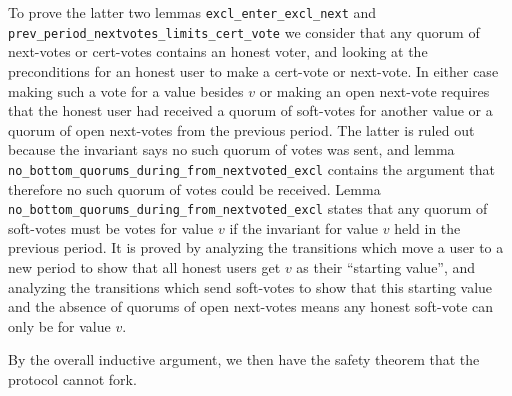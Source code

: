 To prove the latter two lemmas \lstinline{excl_enter_excl_next} and
\lstinline{prev_period_nextvotes_limits_cert_vote} we consider that any quorum
of next-votes or cert-votes contains an honest voter, and looking at the
preconditions for an honest user to make a cert-vote or next-vote.
In either case making such a vote for a value besides $v$ or making an open
next-vote requires that the honest user had received a quorum of
soft-votes for another value or a quorum of open next-votes from the
previous period.
The latter is ruled out because the invariant says no such quorum of votes
was sent, and lemma \lstinline{no_bottom_quorums_during_from_nextvoted_excl}
contains the argument that therefore no such quorum of votes could
be received.
Lemma \lstinline{no_bottom_quorums_during_from_nextvoted_excl}
states that any quorum of soft-votes must be votes for value $v$ if the
invariant for value $v$ held in the previous period.
It is proved by analyzing the transitions which move a user to a new period
to show that all honest users get $v$ as their ``starting value'',
and analyzing the transitions which send soft-votes to show that this
starting value and the absence of quorums of open next-votes means any honest
soft-vote can only be for value $v$.

By the overall inductive argument, we then have the safety theorem that the
protocol cannot fork.
